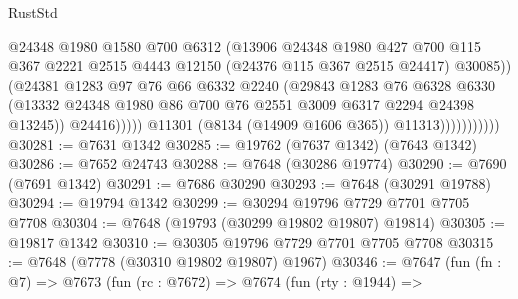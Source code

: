 \begin{lexlean}{RustStd}
\begin{coremodule}
                                    @24348
                                    @1980
                                    @1580
                                    @700
                                    @6312
                                    (@13906
                                      @24348
                                      @1980
                                      @427
                                      @700
                                      @115
                                      @367
                                      @2221
                                      @2515
                                      @4443
                                      @12150
                                      (@24376 @115 @367 @2515 @24417)
                                      @30085))
                                  (@24381
                                    @1283
                                    @97
                                    @76
                                    @66
                                    @6332
                                    @2240
                                    (@29843
                                      @1283
                                      @76
                                      @6328
                                      @6330
                                      (@13332
                                        @24348
                                        @1980
                                        @86
                                        @700
                                        @76
                                        @2551
                                        @3009
                                        @6317
                                        @2294
                                        @24398
                                        @13245))
                                    @24416)))))
                          @11301
                          (@8134 (@14909 @1606 @365))
                          @11313)))))))))))
@30281 := @7631 @1342
@30285 := @19762 (@7637 @1342) (@7643 @1342)
@30286 := @7652 @24743
@30288 := @7648 (@30286 @19774)
@30290 := @7690 (@7691 @1342)
@30291 := @7686 @30290
@30293 := @7648 (@30291 @19788)
@30294 := @19794 @1342
@30299 := @30294 @19796 @7729 @7701 @7705 @7708
@30304 := @7648 (@19793 (@30299 @19802 @19807) @19814)
@30305 := @19817 @1342
@30310 := @30305 @19796 @7729 @7701 @7705 @7708
@30315 := @7648 (@7778 (@30310 @19802 @19807) @1967)
@30346 := @7647
    (fun (fn : @7) =>
    @7673
      (fun (rc : @7672) =>
      @7674
        (fun (rty : @1944) =>

\end{coremodule}
\end{lexlean}
